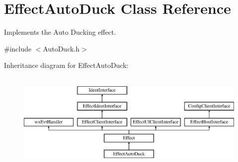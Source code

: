 \hypertarget{class_effect_auto_duck}{}\section{Effect\+Auto\+Duck Class Reference}
\label{class_effect_auto_duck}


Implements the Auto Ducking effect.  




{\ttfamily \#include $<$Auto\+Duck.\+h$>$}

Inheritance diagram for Effect\+Auto\+Duck\+:\begin{figure}[H]
\begin{center}
\leavevmode
\includegraphics[height=4.794520cm]{class_effect_auto_duck}
\end{center}
\end{figure}
